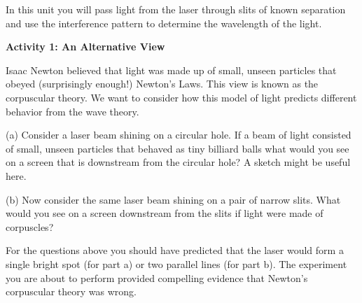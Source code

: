 \vspace{0.3cm}
{\centering {} \par}
\vspace{0.3cm}




In this unit you will pass light from the laser through slits of known
separation and use the interference pattern to determine the wavelength
of the light.

\textbf{Activity 1: An Alternative View}

Isaac Newton believed that light was made up of small, unseen particles
that obeyed (surprisingly enough!) Newton's Laws. This view is known
as the corpuscular theory. We want to consider how this model of light
predicts different behavior from the wave theory.

(a) Consider a laser beam shining on a circular hole. If a beam of
light consisted of small, unseen particles that behaved as tiny billiard
balls what would you see on a screen that is downstream from the circular
hole? A sketch might be useful here.
\vspace{35mm}

(b) Now consider the same laser beam shining on a pair of narrow slits.
What would you see on a screen downstream from the slits if light
were made of corpuscles?
\vspace{35mm}

For the questions above you should have predicted that the laser would
form a single bright spot (for part a) or two parallel lines (for part
b). The experiment you are about to perform provided compelling evidence
that Newton's corpuscular theory was wrong. 
\vspace{7mm}

